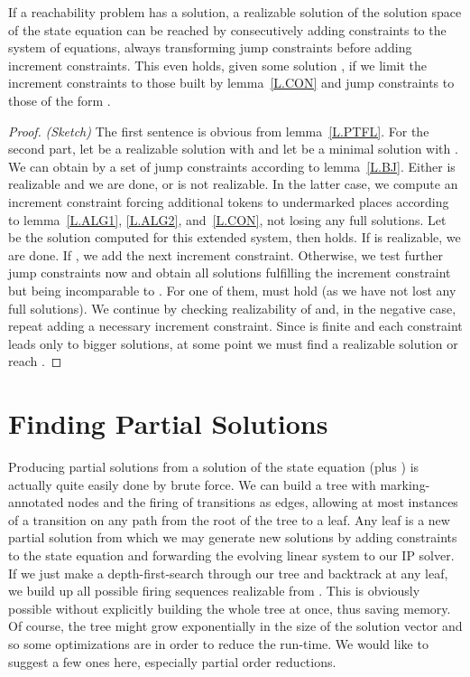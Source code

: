 \documentclass{LMCS}
\begin{document}
\begin{thm}
If a reachability problem has a solution, a realizable solution of the solution space of the state equation can be reached by consecutively adding constraints
to the system of equations, always transforming jump constraints before adding increment constraints.
This even holds, given some solution , if we limit the increment constraints to those built by lemma~\ref{L.CON} and jump constraints to
those of the form .
\end{thm}
\begin{proof} {\em (Sketch)}
The first sentence is obvious from lemma~\ref{L.PTFL}. For the second part, let  be a realizable solution
with  and let  be a minimal solution with . We can obtain  by a set of jump
constraints according to lemma~\ref{L.BJ}. Either  is realizable and we are done, or  is not realizable.
In the latter case, we compute an increment constraint forcing additional tokens to undermarked places according
to lemma~\ref{L.ALG1}, \ref{L.ALG2}, and~\ref{L.CON}, not losing any full solutions. Let  be the solution
computed for this extended system, then  holds. If  is realizable, we are done. If , we add the next
increment constraint. Otherwise, we test further jump constraints now and obtain all solutions  
fulfilling the increment constraint but being incomparable to . For one of them,  must hold (as we
have not lost any full solutions). We continue by checking realizability of  and, in the negative case,
repeat adding a necessary increment constraint. Since  is finite and each constraint leads only to
bigger solutions, at some point we must find a realizable solution or reach .
\end{proof}

\section{Finding Partial Solutions}\label{sec5}

Producing partial solutions  from a solution  of the state equation (plus ) is actually
quite easily done by brute force. We can build a tree with marking-annotated nodes and the firing of transitions as edges,
allowing at most  instances of a transition  on any path from the root of the tree to a leaf. Any leaf is
a new partial solution from which we may generate new solutions by adding constraints to the state equation and
forwarding the evolving linear system to our IP solver. If we just make a depth-first-search through our tree and
backtrack at any leaf, we build up all possible firing sequences realizable from . This is obviously possible
without explicitly building the whole tree at once, thus saving memory.
Of course, the tree might grow exponentially in the size of the solution vector  and so some optimizations
are in order to reduce the run-time. We would like to suggest a few ones here, especially partial order reductions.
\end{document}
